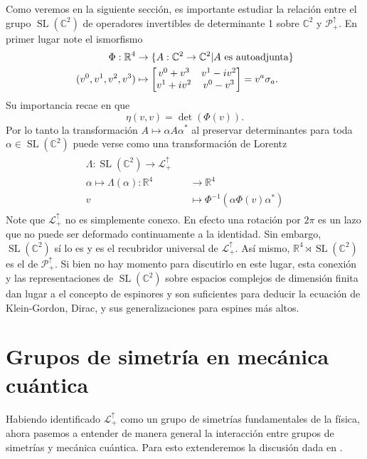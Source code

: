 \documentclass[11pt]{article}
\DeclareMathOperator{\Sl}{SL}
\begin{document}
Como veremos en la siguiente sección, es importante estudiar la relación entre el grupo $\Sl(\mathbb{C}^2)$ de operadores invertibles de determinante 1 sobre $\mathbb{C}^2$ y $\mathcal{P}_+^\uparrow$. En primer lugar note el ismorfismo
\begin{align}
\begin{split}
\Phi:\mathbb{R}^4&\rightarrow\{A:\mathbb{C}^2\rightarrow\mathbb{C}^2|\text{$A$ es autoadjunta}\} \\
(v^0,v^1,v^2,v^3)&\mapsto\mqty[v^0+v^3 & v^1-iv^2 \\ v^1 + iv^2 & v^0-v^3]=v^a\sigma_a. 
\end{split}
\end{align}
Su importancia recae en que
\begin{equation}
\eta(v,v)=\det(\Phi(v)).
\end{equation}
Por lo tanto la transformación $A\mapsto\alpha A\alpha^*$ al preservar determinantes para toda $\alpha\in\Sl(\mathbb{C}^2)$ puede verse como una transformación de Lorentz
\begin{align}
\begin{split}
\Lambda:\Sl(\mathbb{C}^2)\rightarrow\mathcal{L}_+^\uparrow \quad & \\
\alpha\mapsto \Lambda(\alpha):\mathbb{R}^4&\rightarrow\mathbb{R}^4 \\
 v & \mapsto\Phi^{-1}(\alpha\Phi(v)\alpha^*)
\end{split}
\end{align}
Note que $\mathcal{L}_+^\uparrow$ no es simplemente conexo. En efecto una rotación por $2\pi$ es un lazo que no puede ser deformado continuamente a la identidad. Sin embargo, $\Sl(\mathbb{C}^2)$ sí lo es y es el recubridor universal de $\mathcal{L}_+^\uparrow$. Así mismo, $\mathbb{R}^4\rtimes\Sl(\mathbb{C}^2)$ es el de $\mathcal{P}_+^\uparrow$. Si bien no hay momento para discutirlo en este lugar, esta conexión y las representaciones de $\Sl(\mathbb{C}^2)$ sobre espacios complejos de dimensión finita dan lugar a el concepto de espinores y son suficientes para deducir la ecuación de Klein-Gordon, Dirac, y sus generalizaciones para espines más altos\cite{Haag1992}.

\section{Grupos de simetría en mecánica cuántica}

Habiendo identificado $\mathcal{L}_+^\uparrow$ como un grupo de simetrías fundamentales de la física, ahora pasemos a entender de manera general la interacción entre grupos de simetrías y mecánica cuántica. Para esto extenderemos la discusión dada en \cite{Haag1992}.
\end{document}
